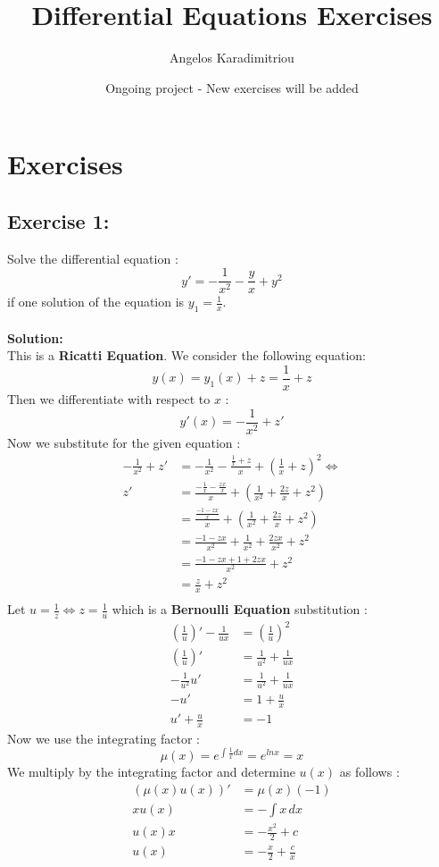 \documentclass{article}
\title{Differential Equations Exercises}
\author{Angelos Karadimitriou}
\date{Ongoing project - New exercises will be added}
\begin{document}
\maketitle

\section{Exercises}
\subsection{Exercise 1:}
Solve the differential equation :
$$y' = -\frac{1}{x^2} - \frac{y}{x} + y^2 $$
if one solution of the equation is $y_1=\frac{1}{x}$. \\\\
\textbf{Solution:} \\
This is a \textbf{Ricatti Equation}. We consider the following equation:
$$y(x) = y_1(x) + z = \frac{1}{x} + z$$
Then we differentiate with respect to $x$ :
$$y'(x) = -\frac{1}{x^2} + z'$$
Now we substitute for the given equation :
\begin{align*}
   -\frac{1}{x^2}+z' &= -\frac{1}{x^2}-\frac{\frac{1}{x}+z}{x}+\left(\frac{1}{x}+z\right)^2  \iff \\
z' &= \frac{-\frac{1}{x}-\frac{zx}{x}}{x}+\left(\frac{1}{x^2}+\frac{2z}{x}+z^2\right)  \\
&= \frac{\frac{-1-zx}{x}}{x}+\left(\frac{1}{x^2}+\frac{2z}{x}+z^2\right)  \\
&= \frac{-1-zx}{x^2}+\frac{1}{x^2}+\frac{2zx}{x^2}+z^2  \\
&= \frac{-1-zx+1+2zx}{x^2}+z^2  \\
&= \frac{z}{x}+z^2  \\
\end{align*}
Let $u = \frac{1}{z} \iff z = \frac{1}{u}$ which is a \textbf{Bernoulli Equation} substitution : 
\begin{align*}
    \left(\frac{1}{u}\right)'-\frac{1}{ux} &= \left(\frac{1}{u}\right)^2 \\
    \left(\frac{1}{u}\right)' &= \frac{1}{u^2}+\frac{1}{ux}  \\
    -\frac{1}{u^2}u' &= \frac{1}{u^2}+\frac{1}{ux}  \\
    -u' &= 1+\frac{u}{x} \\
    u'+\frac{u}{x} &= -1 
\end{align*}
Now we use the integrating factor : 
$$μ(x) = e^{\int\frac{1}{x}dx} = e^{lnx} = x $$
We multiply by the integrating factor and determine $u(x)$ as follows :
\begin{align*}
    (μ(x)u(x))' &= μ(x)(-1) \\
    xu(x) &= -\int{x}\,dx \\
    u(x)x &= -\frac{x^2}{2}+c \\
    u(x) &= -\frac{x}{2}+\frac{c}{x}
\end{align*}
\end{document}
